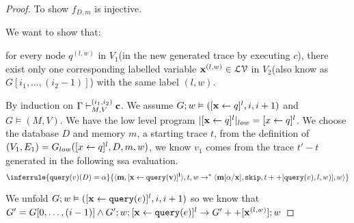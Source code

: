 \documentclass[a4paper,11pt]{article}
\begin{document}
\begin{proof}
 To show $f_{D,m}$ is injective.
 
 We want to show that:
 
 for every node $q^{(l,w)}$ in $V_1$(in the new generated trace by executing $c$), there exist only one corresponding labelled variable $\mathbf{{x}}^{(l,w)} \in \mathcal{LV}$ in $V_2$(also know as $G[i_1,\ldots, (i_2-1)]$) with the same label $(l, w)$. 
 
  
  By induction on $ \Gamma \vdash_{M,V}^{(i_1,i_2)} \mathbf{{c}}$.
  We assume $G;w \vDash ( [ \mathrel{ \mathbf{{x}} \leftarrow q }]^{l} , i, i+1 )$ and $G \vDash (M,V)$. We have the low level program $|[ \mathrel{ \mathbf{{x}} \leftarrow q }]^{l} |_{low} = [\mathrel{ x \leftarrow q }]^{l}$. We choose the database $D$ and memory $m$, a starting trace $t$, 
  from the definition of $(V_1,E_1)= G_{low}( [\mathrel{ x \leftarrow q }]^{l} , D,m,w)$, we know $v_1$ comes from the trace $t' -t$ generated in the following ssa evaluation.
   \[ 
    \inferrule{
     \query(v)(D) = \qval
    }{
   \config{\ssa{m, [\assign{x}{\query(v)}]^{l}}}, t, w  \to^{*} \config{\ssa{m[\qval/x]},\eskip, t++[\query(v),l,w)], w} } \]
 
   We unfold $G; w \vDash ( [\mathrel{ \mathbf{{x}} \leftarrow {\tt query}(e) }]^{l}, i, i+1) $ so we know that 
   $G' = G[0, \ldots, (i-1)] \land G';w; [\mathrel{ \mathbf{{x}} \leftarrow {\tt query}(e) }]^{l} \to G' ++ [\mathbf{{x}}^{(l,w)}]; w$
  

\end{proof}
\end{document}
